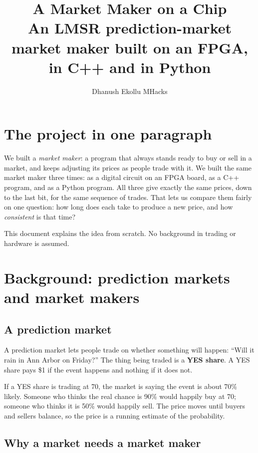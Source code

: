\documentclass[11pt]{article}
\title{\textbf{A Market Maker on a Chip}\\[0.3em]
\large An LMSR prediction-market market maker built on an FPGA, in C++ and in Python}
\author{Dhanush Ekollu \quad MHacks}
\date{}
\newcommand{\cent}{\textcent}
\begin{document}
\maketitle

\section*{The project in one paragraph}

We built a \emph{market maker}: a program that always stands ready to buy or
sell in a market, and keeps adjusting its prices as people trade with it. We
built the same market maker three times: as a digital circuit on an FPGA
board, as a C++ program, and as a Python program. All three give exactly the
same prices, down to the last bit, for the same sequence of trades. That lets
us compare them fairly on one question: how long does each take to produce a
new price, and how \emph{consistent} is that time?

This document explains the idea from scratch. No background in trading or
hardware is assumed.

\setcounter{tocdepth}{1}
\tableofcontents
\newpage

\section{Background: prediction markets and market makers}

\subsection{A prediction market}

A prediction market lets people trade on whether something will happen: ``Will
it rain in Ann Arbor on Friday?'' The thing being traded is a \textbf{YES
share}. A YES share pays \$1 if the event happens and nothing if it does not.

If a YES share is trading at 70\cent, the market is saying the event is about
70\% likely. Someone who thinks the real chance is 90\% would happily buy at
70\cent; someone who thinks it is 50\% would happily sell. The price moves
until buyers and sellers balance, so the price is a running estimate of the
probability.

\subsection{Why a market needs a market maker}
\end{document}
